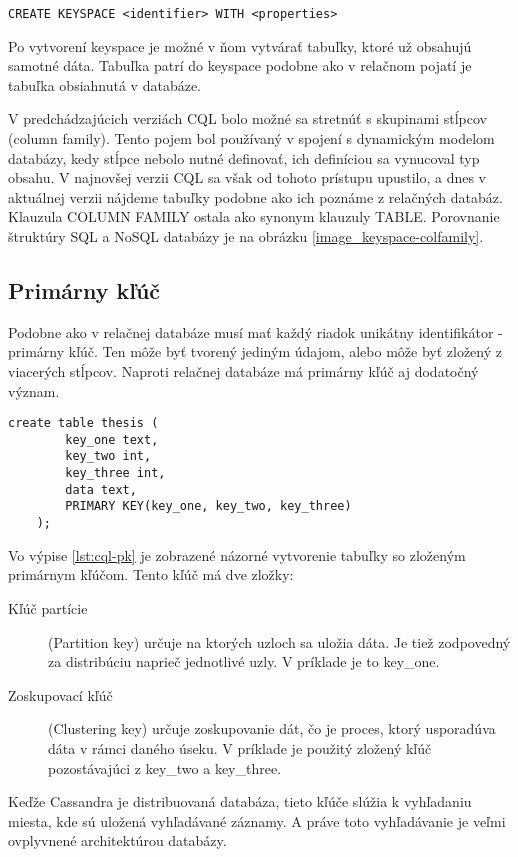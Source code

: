 	\begin{lstlisting}[label=lst:create-keyspace,caption=Syntax pre vytvorenie nového keyspace]
	CREATE KEYSPACE <identifier> WITH <properties>
	\end{lstlisting}
	
	Po vytvorení keyspace je možné v ňom vytvárať tabuľky, ktoré už obsahujú samotné dáta. Tabuľka patrí do keyspace podobne ako v relačnom pojatí je tabuľka obsiahnutá v databáze. 
	
	
	V predchádzajúcich verziách CQL bolo možné sa stretnúť s skupinami stĺpcov (column family). Tento pojem bol používaný v spojení s dynamickým modelom databázy, kedy stĺpce nebolo nutné definovať, ich definíciou sa vynucoval typ obsahu. V najnovšej verzii CQL sa však od tohoto prístupu upustilo, a dnes v aktuálnej verzii nájdeme tabuľky podobne ako ich poznáme z relačných databáz. Klauzula COLUMN FAMILY ostala ako synonym klauzuly TABLE. Porovnanie štruktúry SQL a NoSQL databázy je na obrázku \ref{image_keyspace-colfamily}.
	
	\subsection{Primárny kľúč}
	Podobne ako v relačnej databáze musí mať každý riadok unikátny identifikátor - primárny kľúč. Ten môže byť tvorený jediným údajom, alebo môže byť zložený z viacerých stĺpcov. Naproti relačnej databáze má primárny kľúč aj dodatočný význam.
	
	\begin{lstlisting}[label=lst:cql-pk,caption=Tvorenie primárneho kľúča v CQL]
	create table thesis (
		key_one text,
		key_two int,
		key_three int,
		data text,
		PRIMARY KEY(key_one, key_two, key_three)
	);
	\end{lstlisting}
	
	Vo výpise \ref{lst:cql-pk} je zobrazené názorné vytvorenie tabuľky so zloženým primárnym kľúčom. Tento kľúč má dve zložky:
	\begin{description}
		\item[Kľúč partície] (Partition key) určuje na ktorých uzloch sa uložia dáta. Je tiež zodpovedný za distribúciu naprieč jednotlivé uzly. V príklade je to key\_one.
		\item[Zoskupovací kľúč] (Clustering key) určuje zoskupovanie dát, čo je proces, ktorý usporadúva dáta v rámci daného úseku. V príklade je použitý zložený kľúč pozostávajúci z key\_two a key\_three.
	\end{description}
	Keďže Cassandra je distribuovaná databáza, tieto kľúče slúžia k vyhľadaniu miesta, kde sú uložená vyhľadávané záznamy. A práve toto vyhľadávanie je veľmi ovplyvnené architektúrou databázy.
	
